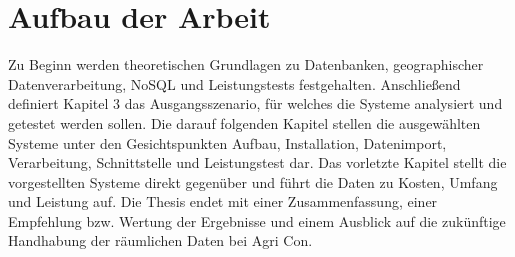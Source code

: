 \section{Aufbau der Arbeit}


Zu Beginn werden theoretischen Grundlagen zu Datenbanken, geographischer Datenverarbeitung, NoSQL und Leistungstests festgehalten.
Anschließend definiert Kapitel 3 das Ausgangsszenario, für welches die Systeme analysiert und getestet werden sollen.
Die darauf folgenden Kapitel stellen die ausgewählten Systeme unter den Gesichtspunkten Aufbau, Installation, Datenimport, Verarbeitung, Schnittstelle und Leistungstest dar.
Das vorletzte Kapitel stellt die vorgestellten Systeme direkt gegenüber und führt die Daten zu Kosten, Umfang und Leistung auf.
Die Thesis endet mit einer Zusammenfassung, einer Empfehlung bzw. Wertung der Ergebnisse und einem Ausblick auf die zukünftige Handhabung der räumlichen Daten bei Agri Con.